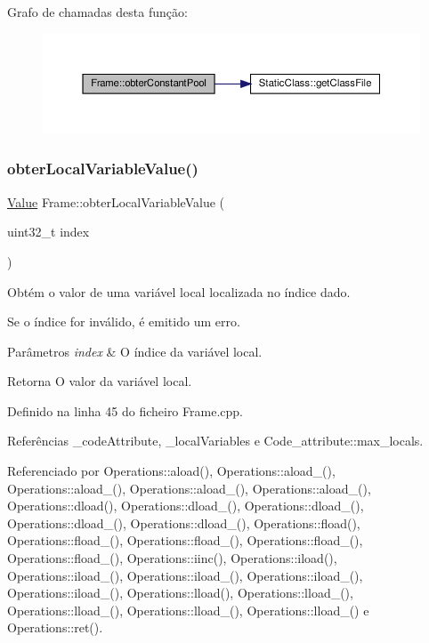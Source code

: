 Grafo de chamadas desta função\+:\nopagebreak
\begin{figure}[H]
\begin{center}
\leavevmode
\includegraphics[width=350pt]{classFrame_a77f9705e64bfbdfc68921b7de11a893f_cgraph}
\end{center}
\end{figure}
\mbox{\label{classFrame_ae074652eb3b71fb4cb28afd1ba91885d}} 
\subsubsection{\texorpdfstring{obter\+Local\+Variable\+Value()}{obterLocalVariableValue()}}
{\footnotesize\ttfamily \hyperlink{structValue}{Value} Frame\+::obter\+Local\+Variable\+Value (\begin{DoxyParamCaption}\item[{uint32\+\_\+t}]{index }\end{DoxyParamCaption})}



Obtém o valor de uma variável local localizada no índice dado. 

Se o índice for inválido, é emitido um erro. 
\begin{DoxyParams}{Parâmetros}
{\em index} & O índice da variável local. \\
\hline
\end{DoxyParams}
\begin{DoxyReturn}{Retorna}
O valor da variável local. 
\end{DoxyReturn}


Definido na linha 45 do ficheiro Frame.\+cpp.



Referências \+\_\+code\+Attribute, \+\_\+local\+Variables e Code\+\_\+attribute\+::max\+\_\+locals.



Referenciado por Operations\+::aload(), Operations\+::aload\+\_(), Operations\+::aload\+\_(), Operations\+::aload\+\_(), Operations\+::aload\+\_(), Operations\+::dload(), Operations\+::dload\+\_(), Operations\+::dload\+\_(), Operations\+::dload\+\_(), Operations\+::dload\+\_(), Operations\+::fload(), Operations\+::fload\+\_(), Operations\+::fload\+\_(), Operations\+::fload\+\_(), Operations\+::fload\+\_(), Operations\+::iinc(), Operations\+::iload(), Operations\+::iload\+\_(), Operations\+::iload\+\_(), Operations\+::iload\+\_(), Operations\+::iload\+\_(), Operations\+::lload(), Operations\+::lload\+\_(), Operations\+::lload\+\_(), Operations\+::lload\+\_(), Operations\+::lload\+\_() e Operations\+::ret().

